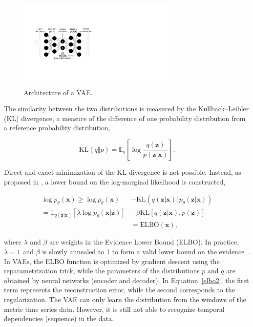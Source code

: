 \begin{figure}[!t]
\centerline{\includegraphics[width=0.7\textwidth]{gfx/chap4/vae.pdf}}
\caption{Architecture of a VAE.}
\label{fig:vae}
\end{figure}


The similarity between the two distributions is measured by the Kullback–Leibler (KL) divergence, a measure of the difference of one probability distribution from a reference probability distribution,

\begin{equation}\label{kl}
    \mathrm{KL}(q \Vert p) = \mathbb{E}_q\left[\log \frac{q(\mathbf{z})}{p(\mathbf{z} \vert \mathbf{x})}\right].
\end{equation}

Direct and exact minimization of the KL divergence is not possible. Instead, as proposed in \cite{jordan1999introduction}, a lower bound on the log-marginal likelihood is constructed,

\begin{align}
    \log p_\theta(\mathbf{x}) \geq \log p_\theta(\mathbf{x}) &- \mathrm{KL}(q(\mathbf{z}\vert \mathbf{x})\Vert p_\theta(\mathbf{z}\vert \mathbf{x})) \label{elbo1} \\ 
    = \mathbb{E}_{q(\mathbf{z} \vert \mathbf{x})}\left[\lambda \log p_\theta(\mathbf{x}|\mathbf{z})\right]
    &- \beta \mathrm{KL}\left[q(\mathbf{z}|\mathbf{x}), p(\mathbf{z})\right] \label{elbo2} \\
    &= \mathrm{ELBO(\mathbf{x})} \nonumber,
\end{align}

where $\lambda$ and $\beta$ are weights in the Evidence Lower Bound (ELBO). In practice, $\lambda=1$ and $\beta$ is slowly annealed to 1 to form a valid lower bound on the evidence~\cite{bowman2015generating}. In VAEs, the ELBO function is optimized by gradient descent using the reparametrization trick, while the parameters of the distributions $p$ and $q$ are obtained by neural networks (encoder and decoder). In Equation~\ref{elbo2}, the first term represents the reconstruction error, while the second corresponds to the regularization. The VAE can only learn the distribution from the windows of the metric time series data. However, it is still not able to recognize temporal dependencies (sequence) in the data.

